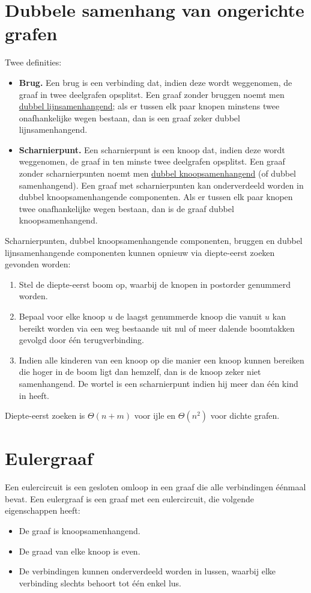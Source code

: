 \section{Dubbele samenhang van ongerichte grafen}
Twee definities:
\begin{itemize}
	\item \textbf{Brug.} Een brug is een verbinding dat, indien deze wordt weggenomen, de graaf in twee deelgrafen opsplitst. Een graaf zonder bruggen noemt men \underline{dubbel lijnsamenhangend}; als er tussen elk paar knopen minstens twee onafhankelijke wegen bestaan, dan is een graaf zeker dubbel lijnsamenhangend.
	\item \textbf{Scharnierpunt.} Een scharnierpunt is een knoop dat, indien deze wordt weggenomen, de graaf in ten minste twee deelgrafen opsplitst. Een graaf zonder scharnierpunten noemt men \underline{dubbel knoopsamenhangend} (of dubbel samenhangend). Een graaf met scharnierpunten kan onderverdeeld worden in dubbel knoopsamenhangende componenten. Als er tussen elk paar knopen twee onafhankelijke wegen bestaan, dan is de graaf dubbel knoopsamenhangend.
\end{itemize}

Scharnierpunten, dubbel knoopsamenhangende componenten, bruggen en dubbel lijnsamenhangende componenten kunnen opnieuw via diepte-eerst zoeken gevonden worden:
\begin{enumerate}
	\item Stel de diepte-eerst boom op, waarbij de knopen in postorder genummerd worden. 
	\item Bepaal voor elke knoop $u$ de laagst genummerde knoop die vanuit $u$ kan bereikt worden via een weg bestaande uit nul of meer dalende boomtakken gevolgd door één terugverbinding. 
	\item Indien alle kinderen van een knoop op die manier een knoop kunnen bereiken die hoger in de boom ligt dan hemzelf, dan is de knoop zeker niet samenhangend. De wortel is een scharnierpunt indien hij meer dan één kind in heeft. 
\end{enumerate}
Diepte-eerst zoeken is $\Theta(n + m)$ voor ijle en $\Theta(n^2)$ voor dichte grafen.
\section{Eulergraaf}
Een eulercircuit is een gesloten omloop in een graaf die alle verbindingen éénmaal bevat. Een eulergraaf is een graaf met een eulercircuit, die volgende eigenschappen heeft:
\begin{itemize}
	\item De graaf is knoopsamenhangend.
	\item De graad van elke knoop is even.
	\item De verbindingen kunnen onderverdeeld worden in lussen, waarbij elke verbinding slechts behoort tot één enkel lus.
\end{itemize}